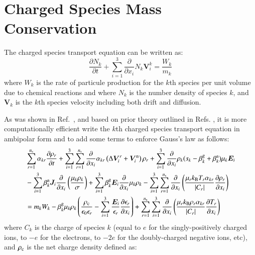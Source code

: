\documentclass{warpdoc}
\newcommand{\ns}{{n_{\rm s}}}
\renewcommand{\vec}[1]{\bm{#1}}
\begin{document}
\section{Charged Species Mass Conservation}

The charged species transport equation can be written as:
%
\begin{equation}
  \frac{\partial N_k}{\partial t} + \sum_{i=1}^3 \frac{\partial}{\partial x_i} N_k \vec{V}_i^k = \frac{W_k}{m_k}
\end{equation}
%
where $W_k$ is the rate of particule production for the $k$th species per unit volume due to chemical reactions and where $N_k$ is the number density of species $k$, and $\vec{V}_k$ is the $k$th species velocity including both drift and diffusion.

As was shown in Ref.\ \cite{jcp:2015:parent}, and based on prior theory outlined in Refs. \cite{jcp:2014:parent,jcp:2011:parent:2, jcp:2013:parent}, it is more computationally efficient write the $k$th charged species transport equation in ambipolar form and to add some terms to enforce Gauss's law as follows:
%
\begin{align}
  &  \sum_{r=1}^{\ns} \alpha_{kr} \frac{\partial \rho_r}{\partial t}  
+ \sum_{i=1}^3 \sum_{r=1}^\ns  \frac{\partial}{\partial x_i}      \alpha_{kr} \left( \Delta \vec{V}_i^r + \vec{V}^{\rm n}_i \right)\rho_r  
  + \sum_{i=1}^3 \frac{\partial}{\partial x_i}  \rho_k  (s_k-\beta_k^{\rm g}+ \beta^{\rm a}_k) \mu_k  \vec{E}_i   
\nonumber \\
&- \sum_{i=1}^3 \beta_k^{\rm a}\vec{J}_i \frac{\partial}{\partial x_i}  \left( \frac{\mu_k \rho_k}{\sigma} 
\right) 
+ \sum_{i=1}^3 \beta_k^{\rm g} \vec{E}_i \frac{\partial }{\partial x_i} \mu_{k} \rho_{k}
- \sum_{i=1}^3 \sum_{r=1}^{\ns} \frac{\partial}{\partial x_i} \left(\frac{\mu_r k_{\rm B} T_r \alpha_{kr}}{|C_r|}  \frac{\partial \rho_r}{\partial x_i}\right) 
\nonumber \\
&= m_k W_k
-\beta_k^{\rm g} \mu_{k} \rho_{k}\left(
  \frac{\rho_{\rm c}}{\epsilon_0\epsilon_r}
  -\sum_{i=1}^3 \frac{\vec{E}_i}{\epsilon_r} \frac{\partial \epsilon_r}{\partial x_i}  
\right)
+ \sum_{r=1}^\ns \sum_{i=1}^3  \frac{\partial}{\partial x_i} \left( \frac{\mu_r k_{\rm B} \rho_r  \alpha_{kr}}{|C_r|}   \frac{\partial T_r}{\partial x_i} \right)
\label{eqn:masscharged}
\end{align}
%
where $C_k$ is the charge of species $k$ (equal to $e$ for the singly-positively charged ions, to $-e$ for the electrons, to $-2e$ for the doubly-charged negative ions, etc), and $\rho_{\rm c}$ is the net charge density defined as:
\end{document}
